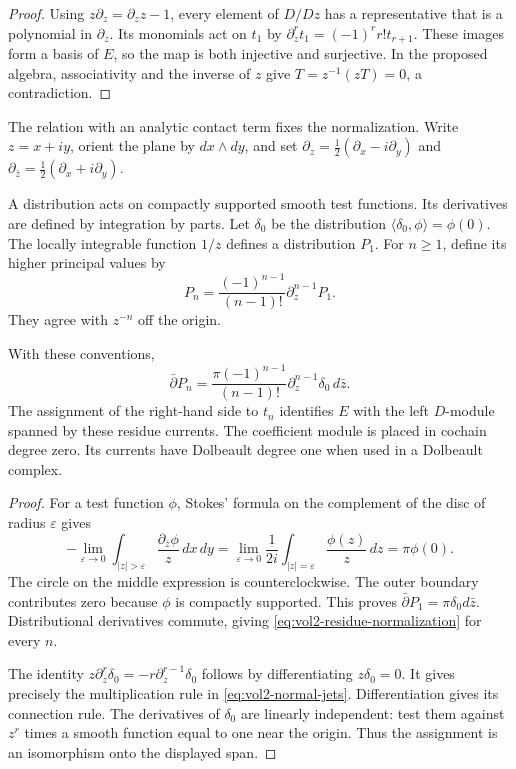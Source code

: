 \begin{proof}
Using $z\partial_z=\partial_z z-1$, every element of $D/Dz$
has a representative that is a polynomial in $\partial_z$.
Its monomials act on $t_1$ by
$\partial_z^r t_1=(-1)^r r!t_{r+1}$. These images form a basis of $E$,
so the map is both injective and surjective.
In the proposed algebra, associativity and the inverse of $z$ give
$T=z^{-1}(zT)=0$, a contradiction.
\end{proof}

The relation with an analytic contact term fixes the normalization.
Write $z=x+iy$, orient the plane by $dx\wedge dy$, and set
$\partial_z=\tfrac12(\partial_x-i\partial_y)$ and
$\partial_{\bar z}=\tfrac12(\partial_x+i\partial_y)$.

A distribution acts on compactly supported smooth test functions.
Its derivatives are defined by integration by parts. Let $\delta_0$
be the distribution $\langle\delta_0,\phi\rangle=\phi(0)$.
The locally integrable function $1/z$ defines a distribution $P_1$.
For $n\geq1$, define its higher principal values by
\[
 P_n=\frac{(-1)^{n-1}}{(n-1)!}\partial_z^{n-1}P_1.
\]
They agree with $z^{-n}$ off the origin.

\begin{proposition}\label{prop:vol2-residue-current}
With these conventions,
\begin{equation}\label{eq:vol2-residue-normalization}
 \bar\partial P_n
 =\frac{\pi(-1)^{n-1}}{(n-1)!}
       \partial_z^{n-1}\delta_0\,d\bar z.
\end{equation}
The assignment of the right-hand side to $t_n$ identifies $E$ with
the left $D$-module spanned by these residue currents. The coefficient
module is placed in cochain degree zero. Its currents have Dolbeault
degree one when used in a Dolbeault complex.
\end{proposition}

\begin{proof}
For a test function $\phi$, Stokes' formula on the complement of the
disc of radius $\varepsilon$ gives
\[
 -\lim_{\varepsilon\to0}\int_{|z|>\varepsilon}
       \frac{\partial_{\bar z}\phi}{z}\,dx\,dy
 =\lim_{\varepsilon\to0}\frac1{2i}
       \int_{|z|=\varepsilon}\frac{\phi(z)}z\,dz
 =\pi\phi(0).
\]
The circle on the middle expression is counterclockwise. The outer
boundary contributes zero because $\phi$ is compactly supported.
This proves $\bar\partial P_1=\pi\delta_0d\bar z$.
Distributional derivatives commute, giving
\eqref{eq:vol2-residue-normalization} for every $n$.

The identity $z\partial_z^r\delta_0=-r\partial_z^{r-1}\delta_0$
follows by differentiating $z\delta_0=0$. It gives precisely the
multiplication rule in \eqref{eq:vol2-normal-jets}. Differentiation
gives its connection rule. The derivatives of $\delta_0$
are linearly independent: test them against $z^r$ times a smooth
function equal to one near the origin. Thus the assignment is an
isomorphism onto the displayed span.
\end{proof}

